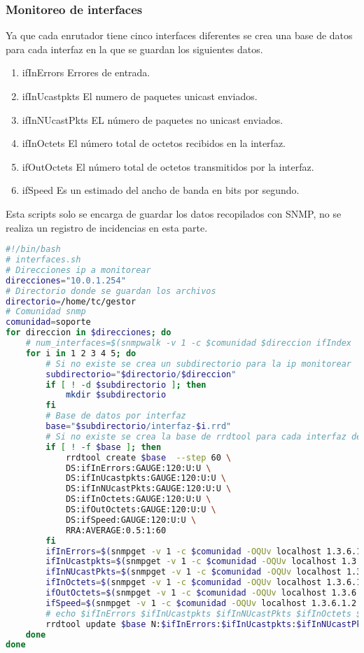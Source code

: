 \documentclass[a4paper,12pt]{article}
\begin{document}
\subsubsection{Monitoreo de interfaces}
Ya que cada enrutador tiene cinco interfaces diferentes se crea una base de datos para cada interfaz en la que se guardan los siguientes datos.
\begin{enumerate}
 \item ifInErrors Errores de entrada.
 \item ifInUcastpkts El numero de paquetes unicast enviados.
 \item ifInNUcastPkts EL número de paquetes no unicast enviados.
 \item ifInOctets El número total de octetos recibidos en la interfaz.
 \item ifOutOctets El número total de octetos transmitidos por la interfaz.
 \item ifSpeed Es un estimado del ancho de banda en bits por segundo.
\end{enumerate}

Esta scripts solo se encarga de guardar los datos recopilados con SNMP, no se realiza un registro de incidencias en esta parte.

\begin{lstlisting}[language=bash]
 #!/bin/bash
# interfaces.sh
# Direcciones ip a monitorear
direcciones="10.0.1.254"
# Directorio donde se guardan los archivos
directorio=/home/tc/gestor
# Comunidad snmp
comunidad=soporte
for direccion in $direcciones; do
    # num_interfaces=$(snmpwalk -v 1 -c $comunidad $direccion ifIndex | awk 'END{print NR}')
    for i in 1 2 3 4 5; do
        # Si no existe se crea un subdirectorio para la ip monitorear
        subdirectorio="$directorio/$direccion"
        if [ ! -d $subdirectorio ]; then
            mkdir $subdirectorio
        fi
        # Base de datos por interfaz
        base="$subdirectorio/interfaz-$i.rrd"
        # Si no existe se crea la base de rrdtool para cada interfaz de ip a monitorear
        if [ ! -f $base ]; then
            rrdtool create $base  --step 60 \
            DS:ifInErrors:GAUGE:120:U:U \
            DS:ifInUcastpkts:GAUGE:120:U:U \
            DS:ifInNUcastPkts:GAUGE:120:U:U \
            DS:ifInOctets:GAUGE:120:U:U \
            DS:ifOutOctets:GAUGE:120:U:U \
            DS:ifSpeed:GAUGE:120:U:U \
            RRA:AVERAGE:0.5:1:60
        fi
        ifInErrors=$(snmpget -v 1 -c $comunidad -OQUv localhost 1.3.6.1.2.1.2.2.1.14.$i)
        ifInUcastpkts=$(snmpget -v 1 -c $comunidad -OQUv localhost 1.3.6.1.2.1.2.2.1.11.$i)
        ifInNUcastPkts=$(snmpget -v 1 -c $comunidad -OQUv localhost 1.3.6.1.2.1.2.2.1.12.$i)
        ifInOctets=$(snmpget -v 1 -c $comunidad -OQUv localhost 1.3.6.1.2.1.2.2.1.10.$i)
        ifOutOctets=$(snmpget -v 1 -c $comunidad -OQUv localhost 1.3.6.1.2.1.2.2.1.16.$i)
        ifSpeed=$(snmpget -v 1 -c $comunidad -OQUv localhost 1.3.6.1.2.1.2.2.1.5.$i)
        # echo $ifInErrors $ifInUcastpkts $ifInNUcastPkts $ifInOctets $ifOutOctets $ifSpeed
        rrdtool update $base N:$ifInErrors:$ifInUcastpkts:$ifInNUcastPkts:$ifInOctets:$ifOutOctets:$ifSpeed
    done
done

\end{lstlisting}
\end{document}
